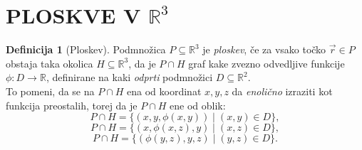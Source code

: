 \documentclass[11pt]{article}
\theoremstyle{definition}
\newtheorem{definicija}{Definicija}[section]
\theoremstyle{definition}
\theoremstyle{definition}
\begin{document}
\pagebreak


\section{PLOSKVE V $\mathbb{R}^3$}
\vspace{0.5cm}


\begin{definicija}[Ploskev]

Podmnožica $P \subseteq \mathbb{R}^3$ je \textit{ploskev}, če za vsako točko $\vec{r} \in P$ obstaja taka okolica $H \subseteq \mathbb{R}^3$, da je $P \cap H$ graf kake zvezno odvedljive funkcije $\phi: D \rightarrow \mathbb{R}$, definirane na kaki \textit{odprti} podmnožici $D \subseteq \mathbb{R}^2$. \\
To pomeni, da se na $P \cap H$ ena od koordinat $x, y, z$ da \textit{enolično} izraziti kot funkcija preostalih, torej da je $P \cap H$ ene od oblik:
$$P \cap H = \{(x, y, \phi(x, y)) \mid (x, y) \in D\},$$
$$P \cap H = \{(x, \phi(x, z), y) \mid (x, z) \in D\},$$
$$P \cap H = \{(\phi(y, z), y, z) \mid (y, z) \in D\}.$$

\end{definicija}
\vspace{0.5cm}
\end{document}
